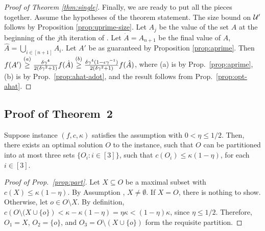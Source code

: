 \begin{proof}[Proof of Theorem \ref{thm:single}]
  Finally, we are ready to put all the pieces together.
  Assume the hypotheses of the theorem statement.
  The size bound on $\mathcal{U}'$ follows by Proposition \ref{prop:uprime-size}.
  Let $A_j$ be the value of the set
  $A$ at the beginning of the $j$th iteration of \qss.
  Let $\dot A = A_{n+1}$ be the final value of $A$,
  $\hat A = \bigcup_{i \in [n + 1]} A_i$.
  Let $A'$ be as guaranteed by Proposition \ref{prop:aprime}.
  Then $f(A') \overset{(a)}{\ge} \frac{\delta \gamma^4 }{2(\delta \gamma^2 + 1)} f( \dot A )
  \overset{(b)}{\ge} \frac{\delta \gamma^4(1 - \epsilon \gamma^{-1})}{2(\delta \gamma^2 + 1)} f( \hat A )$,
  where (a) is by Prop.~\ref{prop:aprime},
  (b) is by Prop.~\ref{prop:ahat-adot},
  and the result follows from Prop.~\ref{prop:opt-ahat}.
\end{proof}

\subsection{Proof of Theorem~2}

\begin{proposition} \label{prop:part}
  Suppose instance $(f,c,\kappa)$ satisfies the \nhi assumption
  with $0 < \eta \le 1/2$.
  Then, there exists an optimal solution $O$ to the instance, such
  that $O$ can be partitioned into at most three sets $\{ O_i : i \in [3] \}$, such
  that $c(O_i) \le \kappa (1 - \eta )$, for each $i \in [3]$.
\end{proposition}

\begin{proof}[Proof of Prop.~\ref{prop:part}]
  Let $X \subseteq O$ be a maximal subset with $c(X) \le \kappa ( 1 - \eta )$.
  By Assumption \nhi, $X \neq \emptyset$. If $X = O$, there is nothing to show.
  Otherwise, let $o \in O \setminus X$. By definition, $c \left( O \setminus (X \cup \{ o \} \right) < \kappa - \kappa ( 1 - \eta ) = \eta \kappa < (1 - \eta) \kappa$, since $\eta \le 1/2$. Therefore, $O_1 = X$, $O_2 = \{ o \}$, and $O_3 = O \setminus (X \cup \{ o \} )$
  form the requisite partition.
\end{proof}

